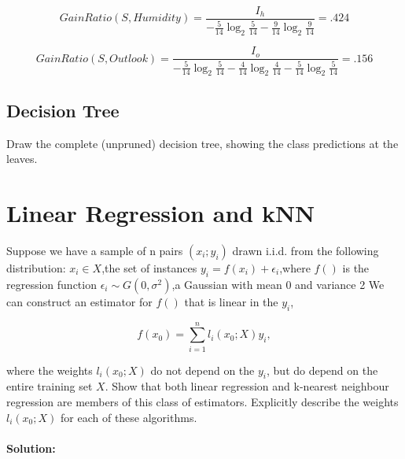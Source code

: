 \documentclass{article}
\begin{document}
$$ GainRatio(S,Humidity) = \frac{I_h}{-\frac{5}{14}\log_2\frac{5}{14} - \frac{9}{14}\log_2\frac{9}{14}} = .424
$$

$$ GainRatio(S,Outlook) = \frac{I_o}{-\frac{5}{14}\log_2\frac{5}{14} - \frac{4}{14}\log_2\frac{4}{14} - \frac{5}{14}\log_2\frac{5}{14}} = .156
$$

\subsection {Decision Tree} 
Draw the complete (unpruned) decision tree, showing the class predictions at the leaves. 


\section{Linear Regression and kNN}

Suppose we have a sample of n pairs $(x_i; y_i)$ drawn i.i.d. from the following
distribution:
\newline
$x_i\in X$,the set of instances
\newline 
$y_i = f(x_i) + \epsilon_i$,where $f()$ is the regression function
\newline 
$\epsilon_i \sim G(0,\sigma^2)$,a Gaussian with mean 0 and variance 2
\newline 
We can construct an estimator for $f()$ that is linear in the $y_i$,

$$f(x_0) =\displaystyle\sum\limits_{i=1}^n l_i(x_0; X)y_i,
$$

where the weights $l_i(x_0;X)$ do not depend on the $y_i$, but do depend on the entire training set $X$. Show that
both linear regression and k-nearest neighbour regression are members of this class of estimators. 
\newline 
Explicitly describe the weights $l_i(x_0;X)$ for each of these algorithms.

\paragraph {Solution:}
\end{document}
